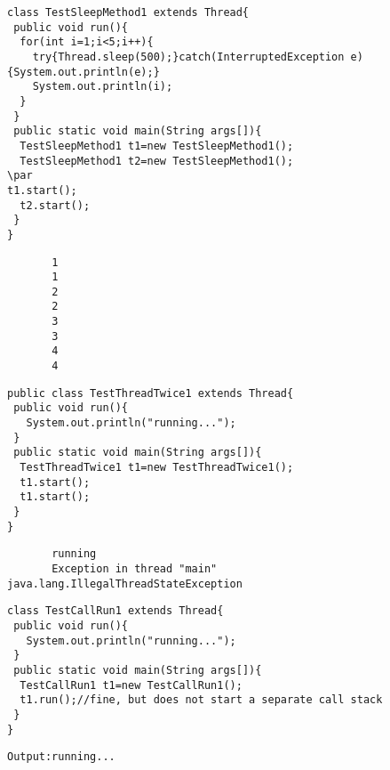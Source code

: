 \documentclass{book}
\def\lthtmlcheckvsize{\ifdim\ht\sizebox<\vsize 
  \ifdim\wd\sizebox<\hsize\expandafter\hfill\fi \expandafter\vfill
  \else\expandafter\vss\fi}%
\begin{document}
{\newpage\clearpage
{}%
\begin{lstlisting}
class TestSleepMethod1 extends Thread{  
 public void run(){  
  for(int i=1;i<5;i++){  
    try{Thread.sleep(500);}catch(InterruptedException e){System.out.println(e);}  
    System.out.println(i);  
  }  
 }  
 public static void main(String args[]){  
  TestSleepMethod1 t1=new TestSleepMethod1();  
  TestSleepMethod1 t2=new TestSleepMethod1();  
\par
t1.start();  
  t2.start();  
 }  
}  
\end{lstlisting}%
\lthtmlfigureZ
\lthtmlcheckvsize\clearpage}

{\newpage\clearpage
{}%
\begin{lstlisting}
       1
       1
       2
       2
       3
       3
       4
       4
		\end{lstlisting}%
\lthtmlfigureZ
\lthtmlcheckvsize\clearpage}

{\newpage\clearpage
{}%
\begin{lstlisting}
public class TestThreadTwice1 extends Thread{  
 public void run(){  
   System.out.println("running...");  
 }  
 public static void main(String args[]){  
  TestThreadTwice1 t1=new TestThreadTwice1();  
  t1.start();  
  t1.start();  
 }  
}  
\end{lstlisting}%
\lthtmlfigureZ
\lthtmlcheckvsize\clearpage}

{\newpage\clearpage
{}%
\begin{lstlisting}
       running
       Exception in thread "main" java.lang.IllegalThreadStateException
\end{lstlisting}%
\lthtmlfigureZ
\lthtmlcheckvsize\clearpage}

{\newpage\clearpage
{}%
\begin{lstlisting}
class TestCallRun1 extends Thread{  
 public void run(){  
   System.out.println("running...");  
 }  
 public static void main(String args[]){  
  TestCallRun1 t1=new TestCallRun1();  
  t1.run();//fine, but does not start a separate call stack  
 }  
}  
\end{lstlisting}%
\lthtmlfigureZ
\lthtmlcheckvsize\clearpage}

{\newpage\clearpage
{}%
\begin{lstlisting}
Output:running...
\end{lstlisting}%
\lthtmlfigureZ
\lthtmlcheckvsize\clearpage}
\end{document}

